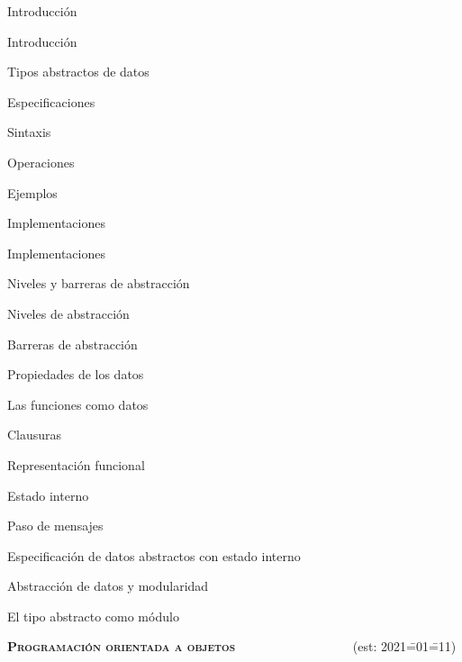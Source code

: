 \begin{longenum}
    \begin{longenum}
        \item Introducción
        \begin{longenum}
            \item Introducción
            \item Tipos abstractos de datos
        \end{longenum}
        \item Especificaciones
        \begin{longenum}
            \item Sintaxis
            \item Operaciones
            \item Ejemplos
        \end{longenum}
        \item Implementaciones
        \begin{longenum}
            \item Implementaciones
        \end{longenum}
        \item Niveles y barreras de abstracción
        \begin{longenum}
            \item Niveles de abstracción
            \item Barreras de abstracción
            \item Propiedades de los datos
        \end{longenum}
        \item Las funciones como datos
        \begin{longenum}
            \item Clausuras
            \item Representación funcional
            \item Estado interno
            \item Paso de mensajes
            \item Especificación de datos abstractos con estado interno
        \end{longenum}
        \item Abstracción de datos y modularidad
        \begin{longenum}
            \item El tipo abstracto como módulo
        \end{longenum}
    \end{longenum}
    \item \textbf{\textsc{Programación orientada a objetos}} \ \ \ \ \ \ \ \ \ \ \ \ \ \ \ \ \ \ (est: 2021\==01\==11)

\end{longenum}

